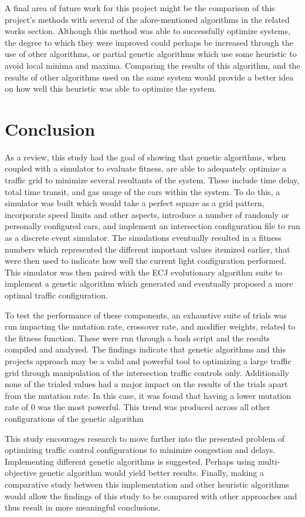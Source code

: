 A final area of future work for this project might be the comparison of this project's methods with several of the afore-mentioned algorithms in the related works section.  Although this method was able to successfully optimize systems, the degree to which they were improved could perhaps be increased through the use of other algorithms, or partial genetic algorithms which use some heuristic to avoid local minima and maxima.  Comparing the results of this algorithm, and the results of other algorithms used on the same system would provide a better idea on how well this heuristic was able to optimize the system.

\section{Conclusion}
As a review, this study had the goal of showing that genetic algorithms, when coupled with a simulator to evaluate fitness, are able to adequately optimize a traffic grid to minimize several resultants of the system.  These include time delay, total time transit, and gas usage of the cars within the system.  To do this, a simulator was built which would take a perfect square as a grid pattern, incorporate speed limits and other aspects, introduce a number of randomly or personally configured cars, and implement an intersection configuration file to run as a discrete event simulator.  The simulations eventually resulted in a fitness numbers which represented the different important values itemized earlier, that were then used to indicate how well the current light configuration performed.  This simulator was then paired with the ECJ evolutionary algorithm suite to implement a genetic algorithm which generated and eventually proposed a more optimal traffic configuration.

To test the performance of these components, an exhaustive suite of trials was run impacting the mutation rate, crossover rate, and modifier weights, related to the fitness function.  These were run through a bash script and the results compiled and analyzed.  The findings indicate that genetic algorithms and this projects approach may be a valid and powerful tool to optimizing a large traffic grid through manipulation of the intersection traffic controls only.  Additionally none of the trialed values had a major impact on the results of the trials apart from the mutation rate.  In this case, it was found that having a lower mutation rate of 0 was the most powerful.  This trend was produced across all other configurations of the genetic algorithm

This study encourages research to move further into the presented problem of optimizing traffic control configurations to minimize congestion and delays.   Implementing different genetic algorithms is suggested.  Perhaps using multi-objective genetic algorithm would yield better results.  Finally, making a comparative study between this implementation and other heuristic algorithms would allow the findings of this study to be compared with other approaches and thus result in more meaningful conclusions.  